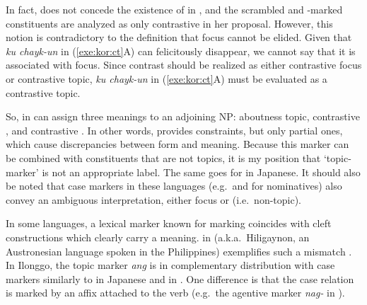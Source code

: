 
\noindent In fact, \citeauthor{choi:99} does not concede the existence
of  in , and the scrambled and
\nun-marked constituents are analyzed as only contrastive  in her
proposal. However, this notion is contradictory to the definition that
focus cannot be elided. Given that \textit{ku chayk-un} in
(\ref{exe:kor:ct}A) can felicitously disappear, we cannot say that it
is associated with focus. Since contrast should be realized as either
contrastive focus or contrastive topic, \textit{ku chayk-un} in
(\ref{exe:kor:ct}A) must be evaluated as a contrastive topic.


So, \nun in  can assign three meanings to an adjoining NP:
aboutness topic, contrastive , and contrastive .  In other
words, \nun provides constraints, but only partial ones, which cause
discrepancies between form and meaning.  Because this marker can be
combined with constituents that are not topics, it is my position that
`topic-marker' is not an appropriate label.  The same goes for \wa in
Japanese.  It should also be noted that case markers in these
languages (e.g.\ \ika and \ga for nominatives) also convey an
ambiguous interpretation, either focus or 
(i.e.\ non-topic).



In some languages, a lexical marker known for marking  coincides
with cleft constructions which clearly carry a 
meaning.  in 
(a.k.a.\ Hiligaynon, an Austronesian language spoken in the
Philippines) exemplifies such a mismatch \citep{schachter:73}. In
Ilonggo, the topic marker \textit{ang} is in complementary
distribution with case markers similarly to \wa in Japanese and \nun
in . One difference is that the case relation is marked by
an affix attached to the verb (e.g.\ the agentive marker \textit{nag-}
in ).



